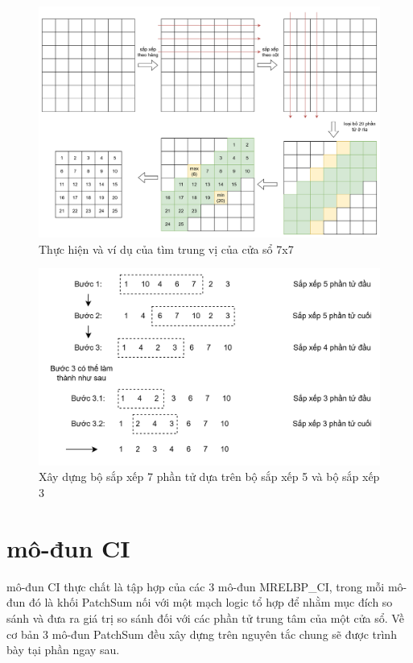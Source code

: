 \begin{figure}[!ht]
	\centering
	\includegraphics[width=\linewidth]{figures/median7x7Example.png}
	\caption{Thực hiện và ví dụ của tìm trung vị của cửa sổ 7x7}
	\label{fig:median7x7Example}
\end{figure}
\begin{figure}[!ht]
	\centering
	\includegraphics[width=0.8\linewidth]{figures/sortAscending7x7Ex.png}
	\caption{Xây dựng bộ sắp xếp 7 phần tử dựa trên bộ sắp xếp 5 và bộ sắp xếp 3}
	\label{fig:sortAscending7x7Ex}
\end{figure}

\section{mô-đun CI}
mô-đun CI thực chất là tập hợp của các 3 mô-đun MRELBP\_CI, trong mỗi mô-đun đó là khối PatchSum nối với một mạch logic tổ hợp để nhằm mục đích so sánh và đưa ra giá trị so sánh đối với các phần tử trung tâm của một cửa sổ. Về cơ bản 3 mô-đun PatchSum đều xây dựng trên nguyên tắc chung sẽ được trình bày tại phần ngay sau.
